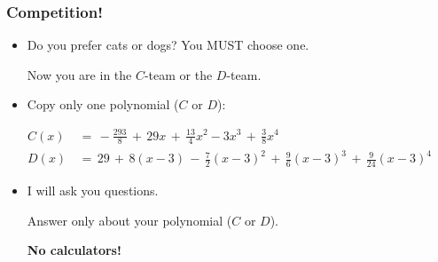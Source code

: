 \begin{frame}[t]
	\frametitle{Competition!}

	\begin{itemize}
		\item Do you prefer cats or dogs? You MUST choose one.

			Now you are in the $C$-team or the $D$-team.


		\item Copy only one polynomial ($C$ or $D$):
	\end{itemize}
	{\fontsize{13}{13}\selectfont \begin{align*}C(x)&\, = \, -\frac{293}{8}\, + \, 29x \, + \, \frac{13}{4}x^{2}-3x^{3}\, + \, \frac{3}{8}x^{4}\phantom{\int}\\ D(x)&\, = \, 29 \, + \, 8(x -3) \, - \, \frac{7}{2}(x-3)^{2}\, + \, \frac{9}{6}(x-3)^{3}\, + \, \frac{9}{24}(x-3)^{4}\end{align*} }
	\begin{itemize}
		\item I will ask you questions.

			Answer only about your polynomial ($C$ or $D$).

			{\bfseries No calculators!}
	\end{itemize}
\end{frame}

